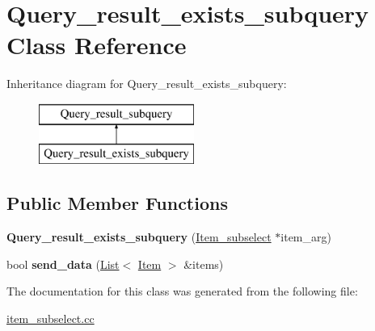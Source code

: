 \hypertarget{classQuery__result__exists__subquery}{}\section{Query\+\_\+result\+\_\+exists\+\_\+subquery Class Reference}
\label{classQuery__result__exists__subquery}
Inheritance diagram for Query\+\_\+result\+\_\+exists\+\_\+subquery\+:\begin{figure}[H]
\begin{center}
\leavevmode
\includegraphics[height=2.000000cm]{classQuery__result__exists__subquery}
\end{center}
\end{figure}
\subsection*{Public Member Functions}
\begin{DoxyCompactItemize}
\item 
\mbox{\label{classQuery__result__exists__subquery_a14ce15ad49e88d13847fa7ef904795d4}} 
{\bfseries Query\+\_\+result\+\_\+exists\+\_\+subquery} (\mbox{\hyperlink{classItem__subselect}{Item\+\_\+subselect}} $\ast$item\+\_\+arg)
\item 
\mbox{\label{classQuery__result__exists__subquery_a29f275ce429f81019f2b245171045563}} 
bool {\bfseries send\+\_\+data} (\mbox{\hyperlink{classList}{List}}$<$ \mbox{\hyperlink{classItem}{Item}} $>$ \&items)
\end{DoxyCompactItemize}


The documentation for this class was generated from the following file\+:\begin{DoxyCompactItemize}
\item 
\mbox{\hyperlink{item__subselect_8cc}{item\+\_\+subselect.\+cc}}\end{DoxyCompactItemize}
